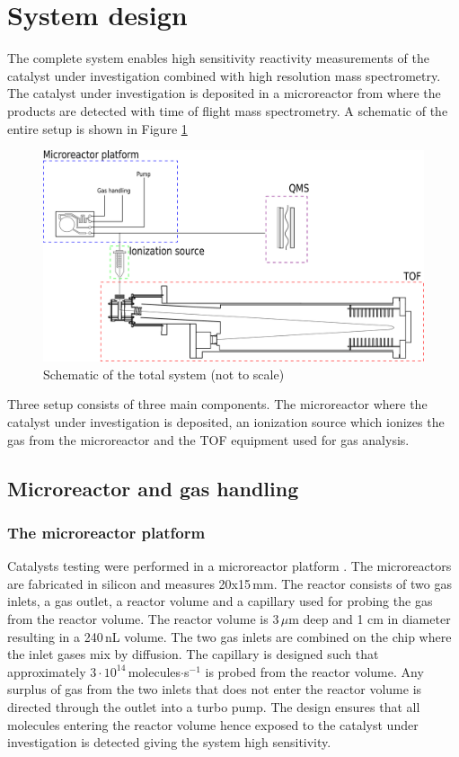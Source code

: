 \documentclass[aip,rsi]{revtex4-1}
\begin{document}
\section{System design}
The complete system enables high sensitivity reactivity measurements of the catalyst under investigation combined with high resolution mass spectrometry. The catalyst under investigation is deposited in a microreactor from where the products are detected with time of flight mass spectrometry. A schematic of the entire setup is shown in Figure \ref{fig:TOF_microreactor}
\begin{figure}
 \includegraphics[width=14cm]{TOF_microreactor.png}%
 \caption{Schematic of the total system (not to scale)\label{fig:TOF_microreactor}}%
\end{figure}
Three setup consists of three main components. The microreactor where the catalyst under investigation is deposited, an ionization source which ionizes the gas from the microreactor and the TOF equipment used for gas analysis. 

\subsection{Microreactor and gas handling}

\subsubsection{The microreactor platform}
Catalysts testing were performed in a microreactor platform \cite{Henriksen2009}. The microreactors are fabricated in silicon and measures 20x15\,mm. The reactor consists of two gas inlets, a gas outlet, a reactor volume and a capillary used for probing the gas from the reactor volume. The reactor volume is 3\,$\mu$m deep and 1 cm in diameter resulting in a 240\,nL volume. The two gas inlets are combined on the chip where the inlet gases mix by diffusion. The capillary is designed such that approximately $3\cdot10^{14}$\,molecules$\cdot$s$^{-1}$ is probed from the reactor volume. Any surplus of gas from the two inlets that does not enter the reactor volume is directed through the outlet into a turbo pump. The design ensures that all molecules entering the reactor volume hence exposed to the catalyst under investigation is detected giving the system high sensitivity.
\end{document}
